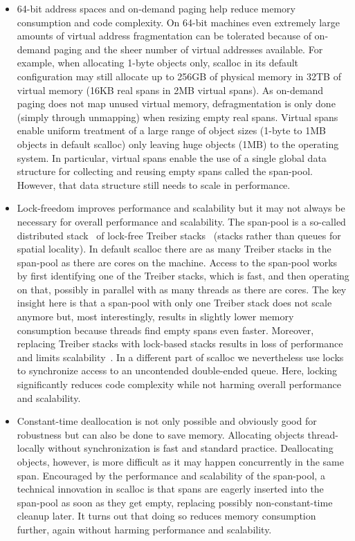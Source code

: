 \documentclass[10pt]{sigplanconf}
\begin{document}
\begin{itemize}
\item 64-bit address spaces and on-demand paging help reduce memory consumption and code complexity. On 64-bit machines even extremely large amounts of virtual address fragmentation can be tolerated because of on-demand paging and the sheer number of virtual addresses available. For example, when allocating 1-byte objects only, scalloc in its default configuration may still allocate up to 256GB of physical memory in 32TB of virtual memory (16KB real spans in 2MB virtual spans). As on-demand paging does not map unused virtual memory, defragmentation is only done (simply through unmapping) when resizing empty real spans. Virtual spans enable uniform treatment of a large range of object sizes (1-byte to 1MB objects in default scalloc) only leaving huge objects (1MB) to the operating system. In particular, virtual spans enable the use of a single global data structure for collecting and reusing empty spans called the span-pool. However, that data structure still needs to scale in performance.

\item Lock-freedom improves performance and scalability but it may not always be necessary for overall performance and scalability. The span-pool is a so-called distributed stack~\cite{Haas:CF13} of lock-free Treiber stacks~\cite{Treiber86} (stacks rather than queues for spatial locality). In default scalloc there are as many Treiber stacks in the span-pool as there are cores on the machine. Access to the span-pool works by first identifying one of the Treiber stacks, which is fast, and then operating on that, possibly in parallel with as many threads as there are cores. The key insight here is that a span-pool with only one Treiber stack does not scale anymore but, most interestingly, results in slightly lower memory consumption because threads find empty spans even faster. Moreover, replacing Treiber stacks with lock-based stacks results in loss of performance and limits scalability~\cite{Henzinger:POPL13}. In a different part of scalloc we nevertheless use locks to synchronize access to an uncontended double-ended queue. Here, locking significantly reduces code complexity while not harming overall performance and scalability.

\item Constant-time deallocation is not only possible and obviously good for robustness but can also be done to save memory. Allocating objects thread-locally without synchronization is fast and standard practice. Deallocating objects, however, is more difficult as it may happen concurrently in the same span. Encouraged by the performance and scalability of the span-pool, a technical innovation in scalloc is that spans are eagerly inserted into the span-pool as soon as they get empty, replacing possibly non-constant-time cleanup later. It turns out that doing so reduces memory consumption further, again without harming performance and scalability.

\end{itemize}
\end{document}
